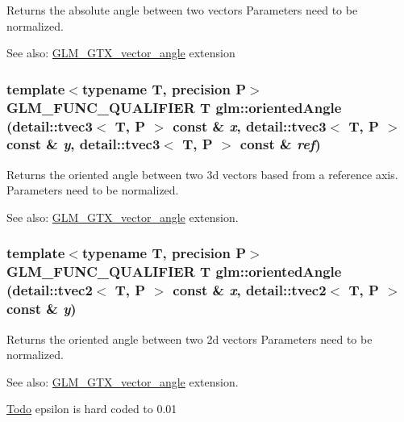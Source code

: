 Returns the absolute angle between two vectors Parameters need to be normalized. \begin{Desc}
\item[See also:]\hyperlink{group__gtx__vector__angle}{GLM\_\-GTX\_\-vector\_\-angle} extension \end{Desc}
\hypertarget{group__gtx__vector__angle_gc56a6bdc5d430b476514d64cb185b772}{
\subsubsection[orientedAngle]{\setlength{\rightskip}{0pt plus 5cm}template$<$typename T, precision P$>$ GLM\_\-FUNC\_\-QUALIFIER T glm::orientedAngle (detail::tvec3$<$ T, P $>$ const \& {\em x}, \/  detail::tvec3$<$ T, P $>$ const \& {\em y}, \/  detail::tvec3$<$ T, P $>$ const \& {\em ref})}}
\label{group__gtx__vector__angle_gc56a6bdc5d430b476514d64cb185b772}


Returns the oriented angle between two 3d vectors based from a reference axis. Parameters need to be normalized. \begin{Desc}
\item[See also:]\hyperlink{group__gtx__vector__angle}{GLM\_\-GTX\_\-vector\_\-angle} extension. \end{Desc}
\hypertarget{group__gtx__vector__angle_gfd969749b953f7a58da4a2563d06ea36}{
\subsubsection[orientedAngle]{\setlength{\rightskip}{0pt plus 5cm}template$<$typename T, precision P$>$ GLM\_\-FUNC\_\-QUALIFIER T glm::orientedAngle (detail::tvec2$<$ T, P $>$ const \& {\em x}, \/  detail::tvec2$<$ T, P $>$ const \& {\em y})}}
\label{group__gtx__vector__angle_gfd969749b953f7a58da4a2563d06ea36}


Returns the oriented angle between two 2d vectors Parameters need to be normalized. \begin{Desc}
\item[See also:]\hyperlink{group__gtx__vector__angle}{GLM\_\-GTX\_\-vector\_\-angle} extension.\end{Desc}
\begin{Desc}
\item[\hyperlink{todo__todo000052}{Todo}]epsilon is hard coded to 0.01 \end{Desc}
